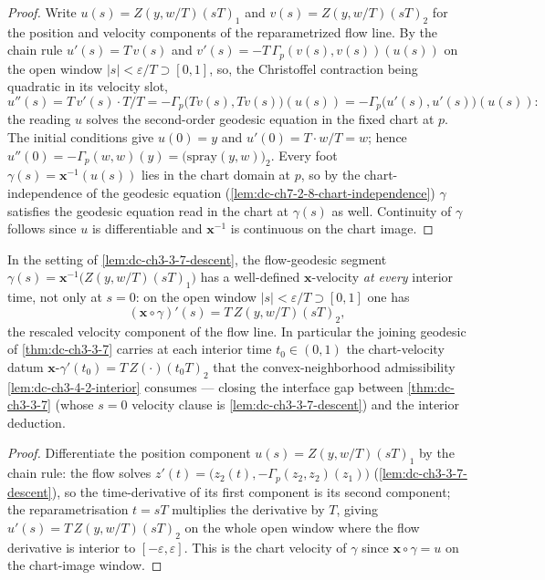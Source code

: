 \begin{proof}
  \sketch

  Write $u(s)=Z(y,w/T)(sT)_1$ and $v(s)=Z(y,w/T)(sT)_2$ for the position and
  velocity components of the reparametrized flow line. By the chain rule
  $u'(s)=T\,v(s)$ and $v'(s)=-T\,\Gamma_p(v(s),v(s))(u(s))$ on the open window
  $|s|<\varepsilon/T\supset[0,1]$, so, the Christoffel contraction being
  quadratic in its velocity slot,
  $$
  u''(s)=T\,v'(s)\cdot T/T=-\Gamma_p\bigl(T v(s),T v(s)\bigr)(u(s))
    =-\Gamma_p\bigl(u'(s),u'(s)\bigr)(u(s)):
  $$
  the reading $u$ solves the second-order geodesic equation in the fixed chart
  at $p$. The initial conditions give $u(0)=y$ and $u'(0)=T\cdot w/T=w$; hence
  $u''(0)=-\Gamma_p(w,w)(y)=\bigl(\mathrm{spray}(y,w)\bigr)_2$. Every
  foot $\gamma(s)=\mathbf{x}^{-1}(u(s))$ lies in the chart domain at $p$, so by
  the chart-independence of the geodesic equation
  (\cref{lem:dc-ch7-2-8-chart-independence}) $\gamma$ satisfies the geodesic
  equation read in the chart at $\gamma(s)$ as well. Continuity of $\gamma$
  follows since $u$ is differentiable and $\mathbf{x}^{-1}$ is continuous on the
  chart image.
\end{proof}

\begin{lemma}
  \label{lem:dc-ch3-3-7-descent-velocity}


  In the setting of \cref{lem:dc-ch3-3-7-descent}, the flow-geodesic segment
  $\gamma(s)=\mathbf{x}^{-1}\bigl(Z(y,w/T)(sT)_1\bigr)$ has a well-defined
  $\mathbf{x}$-velocity \emph{at every} interior time, not only at $s=0$: on the
  open window $|s|<\varepsilon/T\supset[0,1]$ one has
  $$
  (\mathbf{x}\circ\gamma)'(s)=T\,Z(y,w/T)(sT)_2,
  $$
  the rescaled velocity component of the flow line. In particular the joining
  geodesic of \cref{thm:dc-ch3-3-7} carries at each interior time $t_0\in(0,1)$ the
  chart-velocity datum $\mathbf{x}$-$\gamma'(t_0)=T\,Z(\cdot)(t_0T)_2$ that the
  convex-neighborhood admissibility \cref{lem:dc-ch3-4-2-interior} consumes —
  closing the interface gap between \cref{thm:dc-ch3-3-7} (whose $s=0$ velocity
  clause is \cref{lem:dc-ch3-3-7-descent}) and the interior deduction.
\end{lemma}
\begin{proof}
  \sketch

  Differentiate the position component $u(s)=Z(y,w/T)(sT)_1$ by the chain rule:
  the flow solves $z'(t)=\bigl(z_2(t),-\Gamma_p(z_2,z_2)(z_1)\bigr)$
  (\cref{lem:dc-ch3-3-7-descent}), so the time-derivative of its first component
  is its second component; the reparametrisation $t=sT$ multiplies the derivative
  by $T$, giving $u'(s)=T\,Z(y,w/T)(sT)_2$ on the whole open window where the flow
  derivative is interior to $[-\varepsilon,\varepsilon]$. This is the chart velocity
  of $\gamma$ since $\mathbf{x}\circ\gamma=u$ on the chart-image window.
\end{proof}

